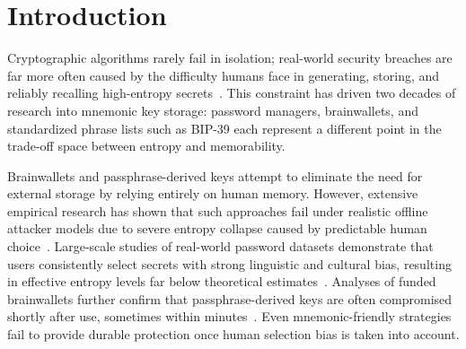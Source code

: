 \documentclass[journal,article,accept,pdftex,moreauthors]{Definitions/mdpi}
\begin{document}




\section{Introduction}

Cryptographic algorithms rarely fail in isolation; real-world security breaches are far more often caused by the difficulty humans face in generating, storing, and reliably recalling high-entropy secrets~\cite{Adams1999}. This constraint has driven two decades of research into mnemonic key storage: password managers, brainwallets, and standardized phrase lists such as BIP-39 each represent a different point in the trade-off space between entropy and memorability.

Brainwallets and passphrase-derived keys attempt to eliminate the need for external storage by relying entirely on human memory. However, extensive empirical research has shown that such approaches fail under realistic offline attacker models due to severe entropy collapse caused by predictable human choice~\cite{Bonneau2012,Vasek2017}. Large-scale studies of real-world password datasets demonstrate that users consistently select secrets with strong linguistic and cultural bias, resulting in effective entropy levels far below theoretical estimates~\cite{Bonneau2012,Kuo2006}. Analyses of funded brainwallets further confirm that passphrase-derived keys are often compromised shortly after use, sometimes within minutes~\cite{Vasek2017,Yang2016}. Even mnemonic-friendly strategies fail to provide durable protection once human selection bias is taken into account.
\end{document}
